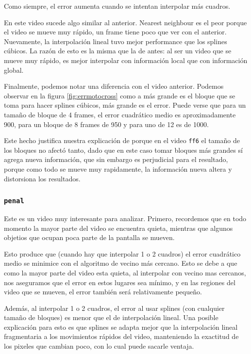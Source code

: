 Como siempre, el error aumenta cuando se intentan interpolar más cuadros.

En este video sucede algo similar al anterior. Nearest neighbour es el peor porque el video se mueve muy rápido, un frame tiene poco que ver con el anterior. Nuevamente, la interpolación lineal tuvo mejor performance que los splines cúbicos. La razón de esto es la misma que la de antes: al ser un video que se mueve muy rápido, es mejor interpolar con información local que con información global.

Finalmente, podemos notar una diferencia con el video anterior. Podemos observar en la figura \ref{fig:errmotocross} como a más grande es el bloque que se toma para hacer splines cúbicos, más grande es el error. Puede verse que para un tamaño de bloque de 4 frames, el error cuadrático medio es aproximadamente 900, para un bloque de 8 frames de 950 y para uno de 12 es de 1000. 


Este hecho justifica nuestra explicación de porque en el video \texttt{ff6} el tamaño de los bloques no afectó tanto, dado que en este caso tomar bloques más grandes sí agrega nueva información, que sin embargo es perjudicial para el resultado, porque como todo se mueve muy rapidamente, la información nueva altera y distorsiona los resultados.

\subsubsection{\texttt{penal}}

Este es un video muy interesante para analizar. Primero, recordemos que en todo momento la mayor parte del video se encuentra quieta, mientras que algunos objetios que ocupan poca parte de la pantalla se mueven. 

Esto produce que (cuando hay que interpolar 1 o 2 cuadros) el error cuadrático medio se minimice con el algoritmo de vecino más cercano. Esto se debe a que como la mayor parte del video esta quieta, al interpolar con vecino mas cercanos, nos aseguramos que el error en estos lugares sea mínimo, y en las regiones del video que se mueven, el error tambi\'en será relativamente pequeño.

Además, al interpolar 1 o 2 cuadros, el error al usar splines (con cualquier tamaño de bloques) es menor que el de interpolación lineal. Una posible explicación para esto es que splines se adapta mejor que la interpolación lineal fragmentaria a los movimientos rápidos del video, manteniendo la exactitud de los pixeles que cambian poco, con lo cual puede sacarle ventaja.

